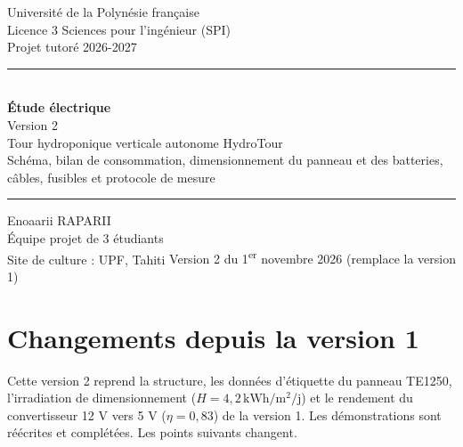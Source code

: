 \documentclass[11pt,a4paper]{article}
\newcommand{\U}[1]{\,\mathrm{#1}}
\begin{document}
\begin{titlepage}
\thispagestyle{plain}
\centering
\vspace*{1.5cm}
{\large Université de la Polynésie française}\\[4pt]
{\large Licence 3 Sciences pour l'ingénieur (SPI)}\\[4pt]
{Projet tutoré 2026-2027}
\vspace{3.5cm}

{\color{bleutitre}\rule{\linewidth}{1pt}}\\[12pt]
{\Huge\bfseries\color{bleutitre} Étude électrique}\\[8pt]
{\Large\color{bleutitre} Version 2}\\[12pt]
{\Large Tour hydroponique verticale autonome HydroTour}\\[6pt]
{\large Schéma, bilan de consommation, dimensionnement du panneau et des batteries,\\ câbles, fusibles et protocole de mesure}\\[12pt]
{\color{bleutitre}\rule{\linewidth}{1pt}}
\vspace{3cm}

{\Large Enoaarii RAPARII}\\[6pt]
{Équipe projet de 3 étudiants}\\[6pt]
{Site de culture : UPF, Tahiti}
\vfill
{Version 2 du 1\textsuperscript{er} novembre 2026 (remplace la version 1)}
\end{titlepage}
\setcounter{page}{2}

\tableofcontents
\newpage

\section*{Changements depuis la version 1}

Cette version 2 reprend la structure, les données d'étiquette du panneau TE1250, l'irradiation de dimensionnement ($H = 4{,}2\U{kWh/m^2/j}$) et le rendement du convertisseur 12 V vers 5 V ($\eta = 0{,}83$) de la version 1. Les démonstrations sont réécrites et complétées. Les points suivants changent.
\end{document}
